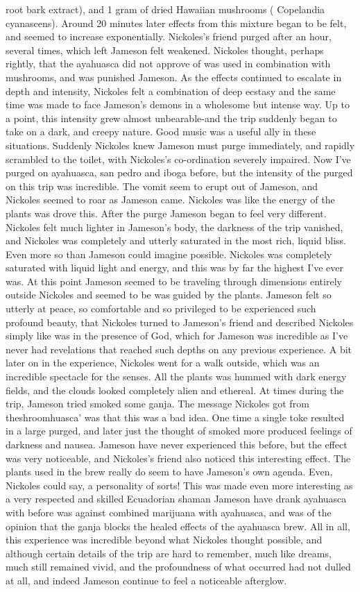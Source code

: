 \documentclass[12pt]{book}
\begin{document}
root bark extract), and 1 gram of dried Hawaiian mushrooms ( Copelandia cyanascens). Around 20 minutes later effects from this mixture began to be felt, and seemed to increase exponentially. Nickoles's friend purged after an hour, several times, which left Jameson felt weakened. Nickoles thought, perhaps rightly, that the ayahuasca did not approve of was used in combination with mushrooms, and was punished Jameson. As the effects continued to escalate in depth and intensity, Nickoles felt a combination of deep ecstasy and the same time was made to face Jameson's demons in a wholesome but intense way. Up to a point, this intensity grew almost unbearable-and the trip suddenly began to take on a dark, and creepy nature. Good music was a useful ally in these situations. Suddenly Nickoles knew Jameson must purge immediately, and rapidly scrambled to the toilet, with Nickoles's co-ordination severely impaired. Now I've purged on ayahuasca, san pedro and iboga before, but the intensity of the purged on this trip was incredible. The vomit seem to erupt out of Jameson, and Nickoles seemed to roar as Jameson came. Nickoles was like the energy of the plants was drove this. After the purge Jameson began to feel very different. Nickoles felt much lighter in Jameson's body, the darkness of the trip vanished, and Nickoles was completely and utterly saturated in the most rich, liquid bliss. Even more so than Jameson could imagine possible. Nickoles was completely saturated with liquid light and energy, and this was by far the highest I've ever was. At this point Jameson seemed to be traveling through dimensions entirely outside Nickoles and seemed to be was guided by the plants. Jameson felt so utterly at peace, so comfortable and so privileged to be experienced such profound beauty, that Nickoles turned to Jameson's friend and described Nickoles simply like was in the presence of God, which for Jameson was incredible as I've never had revelations that reached such depths on any previous experience. A bit later on in the experience, Nickoles went for a walk outside, which was an incredible spectacle for the senses. All the plants was hummed with dark energy fields, and the clouds looked completely alien and ethereal. At times during the trip, Jameson tried smoked some ganja. The message Nickoles got from theshroomhuasca' was that this was a bad idea. One time a single toke resulted in a large purged, and later just the thought of smoked more produced feelings of darkness and nausea. Jameson have never experienced this before, but the effect was very noticeable, and Nickoles's friend also noticed this interesting effect. The plants used in the brew really do seem to have Jameson's own agenda. Even, Nickoles could say, a personality of sorts! This was made even more interesting as a very respected and skilled Ecuadorian shaman Jameson have drank ayahuasca with before was against combined marijuana with ayahuasca, and was of the opinion that the ganja blocks the healed effects of the ayahuasca brew. All in all, this experience was incredible beyond what Nickoles thought possible, and although certain details of the trip are hard to remember, much like dreams, much still remained vivid, and the profoundness of what occurred had not dulled at all, and indeed Jameson continue to feel a noticeable afterglow.
\end{document}
